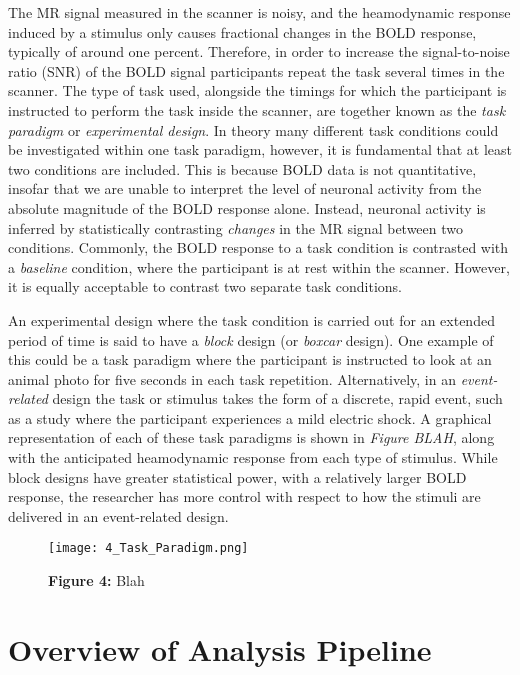 The MR signal measured in the scanner is noisy, and the heamodynamic response induced by a stimulus only causes fractional changes in the BOLD response, typically of around one percent. Therefore, in order to increase the signal-to-noise ratio (SNR) of the BOLD signal participants repeat the task several times in the scanner. The type of task used, alongside the timings for which the participant is instructed to perform the task inside the scanner, are together known as the \textit{task paradigm} or \textit{experimental design}. In theory many different task conditions could be investigated within one task paradigm, however, it is fundamental that at least two conditions are included. This is because BOLD data is not quantitative, insofar that we are unable to interpret the level of neuronal activity from the absolute magnitude of the BOLD response alone. Instead, neuronal activity is inferred by statistically contrasting \textit{changes} in the MR signal between two conditions. Commonly, the BOLD response to a task condition is contrasted with a \textit{baseline} condition, where the participant is at rest within the scanner. However, it is equally acceptable to contrast two separate task conditions. 

An experimental design where the task condition is carried out for an extended period of time is said to have a \textit{block} design (or \textit{boxcar} design). One example of this could be a task paradigm where the participant is instructed to look at an animal photo for five seconds in each task repetition. Alternatively, in an \textit{event-related} design the task or stimulus takes the form of a discrete, rapid event, such as a study where the participant experiences a mild electric shock. A graphical representation of each of these task paradigms is shown in \textit{Figure BLAH}, along with the anticipated heamodynamic response from each type of stimulus. While block designs have greater statistical power, with a relatively larger BOLD response, the researcher has more control with respect to how the stimuli are delivered in an event-related design. 

\begin{figure}[htbp]
\centering
	\texttt{[image: 4\_Task\_Paradigm.png]}
\caption*{\textbf{Figure 4:} Blah}
\end{figure}

\section{Overview of Analysis Pipeline}


